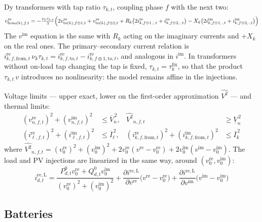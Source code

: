 \documentclass[11pt,a4paper]{article}
\newcommand{\vre}{v^{\mathrm{re}}} \newcommand{\vim}{v^{\mathrm{im}}}
\newcommand{\ire}{i^{\mathrm{re}}} \newcommand{\iim}{i^{\mathrm{im}}}
\newcommand{\ireL}{i^{\mathrm{re,L}}} \newcommand{\ireG}{i^{\mathrm{re,G}}}
\begin{document}
Dy transformers with tap ratio $\tau_{k,t}$, coupling phase $f$ with the next two:
\begin{equation}
\vre_{\mathrm{from}(k),f,t} = -\tfrac{\nu_k \tau_{k,t}}{3}\Bigl(2\vre_{\mathrm{to}(k),f\oplus1,t}+\vre_{\mathrm{to}(k),f\oplus2,t}
+ R_k\bigl(2\ire_{k,f\oplus1,\cdot,t}+\ire_{k,f\oplus2,\cdot,t}\bigr) - X_k\bigl(2\iim_{k,f\oplus1,\cdot,t}+\iim_{k,f\oplus2,\cdot,t}\bigr)\Bigr)
\end{equation}
The $\vim$ equation is the same with $R_k$ acting on the imaginary currents and $+X_k$ on the real
ones. The primary--secondary current relation is
$\ire_{k,f,\mathrm{from},t}\,\nu_k\tau_{k,t} = \ire_{k,f,\mathrm{to},t}-\ire_{k,f\oplus1,\mathrm{to},t}$,
and analogous in $\iim$. In transformers without on-load tap changing the tap is fixed,
$\tau_{k,t}=\tau_k^{\mathrm{fix}}$, so that the product $\tau_{k,t}\,v$ introduces no
nonlinearity: the model remains affine in the injections.

Voltage limits --- upper exact, lower on the first-order approximation
$\widehat{V^2}$ --- and thermal limits:
\begin{align}
(\vre_{n,f,t})^2+(\vim_{n,f,t})^2 &\le \overline{V}_n^{\,2},
&\widehat{V^2}_{n,f,t} &\ge \underline{V}_n^{\,2}\\
(\ire_{\ell,f,t})^2+(\iim_{\ell,f,t})^2 &\le \overline{I}_\ell^{\,2},
&(\ire_{k,f,\mathrm{from},t})^2+(\iim_{k,f,\mathrm{from},t})^2 &\le \overline{I}_k^{\,2}
\end{align}
where $\widehat{V^2}_{n,f,t} = (\vre_0)^2+(\vim_0)^2+2\vre_0(\vre-\vre_0)+2\vim_0(\vim-\vim_0)$.
The load and PV injections are linearized in the same way, around $(\vre_0,\vim_0)$:
\begin{equation}
\ireL_{d,t} = \frac{P^0_{d,t}\vre_0 + Q^0_{d,t}\vim_0}{(\vre_0)^2+(\vim_0)^2}
+ \frac{\partial \ireL}{\partial \vre}\bigl(\vre-\vre_0\bigr)
+ \frac{\partial \ireL}{\partial \vim}\bigl(\vim-\vim_0\bigr)
\end{equation}

\subsection{Batteries}
\end{document}
